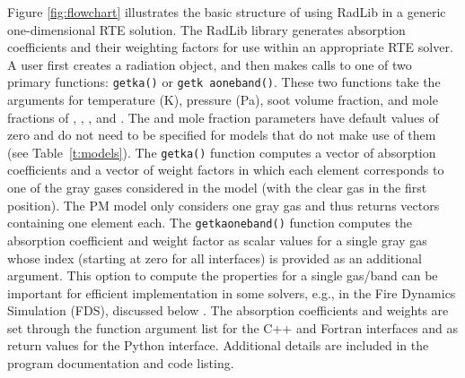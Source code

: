 \documentclass[preprint,12pt]{elsarticle}
\begin{document}
    Figure \ref{fig:flowchart} illustrates the basic structure of using RadLib in a generic one-dimensional RTE
    solution. The RadLib library generates absorption coefficients and their weighting factors for use within an
    appropriate RTE solver. A user first creates a radiation object, and then makes calls to one of two primary
    functions: \texttt{get\textunderscore k\textunderscore a()} or \texttt{get\textunderscore k\textunderscore
    a\textunderscore oneband()}.
    These two functions take the arguments for temperature (K), pressure (Pa), soot volume fraction, and mole
    fractions of , , , and . The  and  mole fraction
    parameters have default values of zero and do not need to be specified for models that do not make use of them
    (see Table~\ref{t:models}). The \texttt{get\textunderscore k\textunderscore a()} function computes a vector of
    absorption coefficients and a vector of weight factors in which each element corresponds to one of the gray gases
    considered in the model (with the clear gas in the first position). The PM model only considers one gray gas and
    thus returns vectors containing one element each.
    The \texttt{get\textunderscore k\textunderscore a\textunderscore oneband()} function computes the
    absorption coefficient and weight factor as scalar values for a single gray gas whose index
    (starting at zero for all interfaces) is provided as an additional argument. This option to compute the
    properties for a single gas/band can be important for efficient implementation in some solvers, e.g., in the Fire
    Dynamics Simulation (FDS), discussed below \cite{FDS}. The absorption coefficients and weights are set through
    the function argument list for the C++ and Fortran interfaces and as return values for the Python interface.
    Additional details are included in the program documentation and code listing.
%
\end{document}
